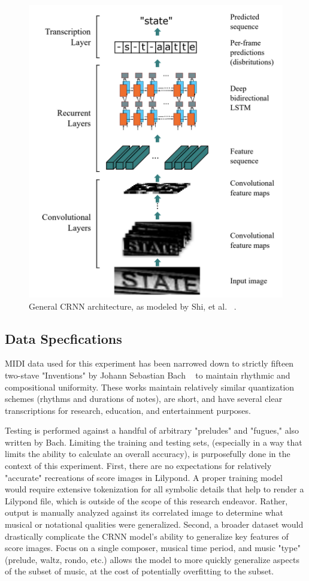 \documentclass[nonacm, sigconf]{acmart}
\begin{document}
\begin{figure}
	\centering
	\includegraphics[width = .8\linewidth]{./figures/crnn_arch.png}
	\caption{General CRNN architecture, as modeled by Shi, et al. ~\cite{shi2015endtoend}.}
	\label{fig:crnn-arch}
\end{figure}

\subsection{Data Specfications}
MIDI data used for this experiment has been narrowed down to strictly fifteen two-stave "Inventions" by Johann Sebastian Bach ~\cite{bach_midi} to maintain rhythmic and compositional uniformity.
These works maintain relatively similar quantization schemes (rhythms and durations of notes), are short, and have several clear transcriptions for research, education, and entertainment purposes.

Testing is performed against a handful of arbitrary "preludes" and "fugues," also written by Bach. 
Limiting the training and testing sets, (especially in a way that limits the ability to calculate an overall accuracy), is purposefully done in the context of this experiment.
First, there are no expectations for relatively "accurate" recreations of score images in Lilypond. 
A proper training model would require extensive tokenization for all symbolic details that help to render a Lilypond file, which is outside of the scope of this research endeavor.
Rather, output is manually analyzed against its correlated image to determine what musical or notational qualities were generalized.
Second, a broader dataset would drastically complicate the CRNN model's ability to generalize key features of score images.
Focus on a single composer, musical time period, and music "type" (prelude, waltz, rondo, etc.) allows the model to more quickly generalize aspects of the subset of music, at the cost of potentially overfitting to the subset.
\end{document}
